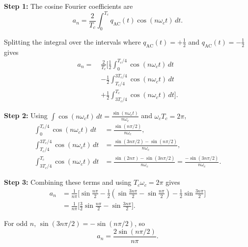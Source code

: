 \begin{tcolorbox}[breakable, colback=orange!5!white,
colframe=orange!60!black,
title={\textbf{Intuition: Fourier Series of the Rectification Function (Part 2: Computing the Coefficients)}}]
\textbf{Step 1:} The cosine Fourier coefficients are
\begin{equation}
a_n = \frac{2}{T_c}\int_0^{T_c} q_{\mathrm{AC}}(t)\cos(n\omega_c t)\,dt.
\end{equation}

Splitting the integral over the intervals where
$q_{\mathrm{AC}}(t)=+\tfrac{1}{2}$ and $q_{\mathrm{AC}}(t)=-\tfrac{1}{2}$ gives
\begin{align}
a_n =\; &\frac{2}{T_c}\Bigg[
\frac{1}{2}\int_0^{T_c/4}\cos(n\omega_c t)\,dt \nonumber\\
&-\frac{1}{2}\int_{T_c/4}^{3T_c/4}\cos(n\omega_c t)\,dt \nonumber\\
&+\frac{1}{2}\int_{3T_c/4}^{T_c}\cos(n\omega_c t)\,dt\Bigg].
\end{align}

\textbf{Step 2:} Using
$\int \cos(n\omega_c t)\,dt = \frac{\sin(n\omega_c t)}{n\omega_c}$ and
$\omega_c T_c = 2\pi$,
\begin{align}
\int_0^{T_c/4}\cos(n\omega_c t)\,dt
&= \frac{\sin(n\pi/2)}{n\omega_c},\\[4pt]
\int_{T_c/4}^{3T_c/4}\cos(n\omega_c t)\,dt
&= \frac{\sin(3n\pi/2)-\sin(n\pi/2)}{n\omega_c},\\[4pt]
\int_{3T_c/4}^{T_c}\cos(n\omega_c t)\,dt
&= \frac{\sin(2n\pi)-\sin(3n\pi/2)}{n\omega_c}
= \frac{-\sin(3n\pi/2)}{n\omega_c}.
\end{align}

\textbf{Step 3:} Combining these terms and using $T_c\omega_c = 2\pi$ gives
\begin{align}
a_n &= \frac{1}{n\pi}\Bigg[
\sin\!\frac{n\pi}{2}
- \frac{1}{2}\!\left(\sin\!\frac{3n\pi}{2} - \sin\!\frac{n\pi}{2}\right)
- \frac{1}{2}\sin\!\frac{3n\pi}{2}
\Bigg] \nonumber\\[4pt]
&= \frac{1}{n\pi}\Bigg[
\frac{3}{2}\sin\!\frac{n\pi}{2}
- \sin\!\frac{3n\pi}{2}
\Bigg].
\end{align}

For odd $n$, $\sin(3n\pi/2)=-\sin(n\pi/2)$, so
\begin{equation}
\boxed{a_n = \frac{2\sin(n\pi/2)}{n\pi}}.
\end{equation}
\end{tcolorbox}

